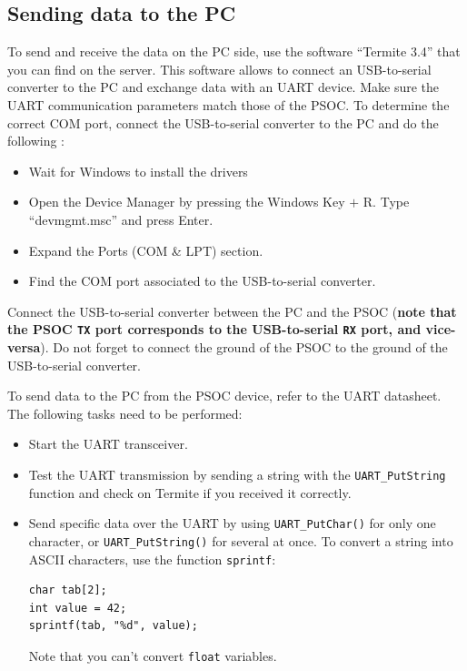 \documentclass[11pt,a4paper]{article}
\theoremstyle{definition}%
\begin{document}
\subsection{Sending data to the PC}
To send and receive the data on the PC side, use the software ``Termite 3.4'' that you can find on the server. This software allows to connect an USB-to-serial converter to the PC and exchange data with an UART device. Make sure the UART communication parameters match those of the PSOC. To determine the correct COM port, connect the USB-to-serial converter to the PC and do the following : 
\begin{itemize}
\item Wait for Windows to install the drivers
\item Open the Device Manager by pressing the Windows Key $+$ R. Type “devmgmt.msc” and press Enter.
\item Expand the Ports (COM \& LPT) section.
\item Find the COM port associated to the USB-to-serial converter. 
\end{itemize}
Connect the USB-to-serial converter between the PC and the PSOC (\textbf{note that the PSOC \texttt{TX} port corresponds to the USB-to-serial \texttt{RX} port, and vice-versa}). Do not forget to connect the ground of the PSOC to the ground of the USB-to-serial converter. 

To send data to the PC from the PSOC device, refer to the UART datasheet. The following tasks need to be performed: 
\begin{itemize}
	\item Start the UART transceiver. 
	\item Test the UART transmission by sending a string with the \texttt{UART\_PutString} function and check on Termite if you received it correctly.
	\item Send specific data over the UART by using \texttt{UART\_PutChar()} for only one character, or \texttt{UART\_PutString()} for several at once.
    To convert a string into ASCII characters, use the function \texttt{sprintf}:
\begin{lstlisting}[style=CStyle]
char tab[2];
int value = 42;
sprintf(tab, "%d", value);
\end{lstlisting}
Note that you can't convert \texttt{float} variables.
\end{itemize}
\end{document}

